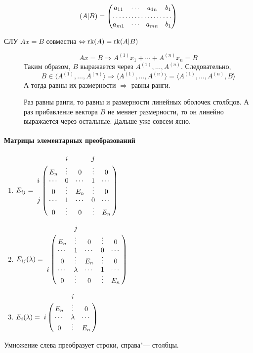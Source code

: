 \documentclass[12pt]{../../../notes}
\begin{document}
\begin{defn}\label{defn:extmtx}
  \[
    (A|B) = 
    \begin{pmatrix}
      a_{11} & \cdots & a_{1n} & b_1 \\
      \hdotsfor{4} \\
      a_{m1} & \cdots & a_{mn} & b_1 
    \end{pmatrix}
  \]
\end{defn}
\begin{thrm}\label{thrm:kronkap}
  СЛУ $Ax =B$ совместна $\Leftrightarrow \operatorname{rk} (A) = \operatorname{rk} (A|B)$
\end{thrm}
\begin{ittproof}
  \begin{description}
    \item[\circlearound{$\Rightarrow$}] 
      \[
        A x = B \Rightarrow A^{(1)} x_1 + \dotsb + A^{(n)} x_n = B
      \]
      Таким образом, $B$ выражается через $A^{(1)}, \dotsc , A^{(n)}$.
      Следовательно,
      \[
        B \in \langle A^{(1)}, \dotsc , A^{(n)}\rangle 
        \Rightarrow 
        \langle A^{(1)}, \dotsc , A^{(n)}\rangle  = \langle A^{(1)}, \dotsc , A^{(n)}, B\rangle 
      \]
      А тогда равны их размерности $\Rightarrow$ равны ранги.
    \item[\circlearound{$\Leftarrow$}] 
      Раз равны ранги, то равны и размерности линейных оболочек столбцов. А раз прибавление
      вектора $B$ не меняет размерности, то он линейно выражается через остальные. Дальше уже
      совсем ясно.
  \end{description}
\end{ittproof}

\paragraph{Матрицы элементарных преобразований}
\begin{enumerate}[I]
  \item $\displaystyle
      E_{ij} = \bordermatrix{
        ~ & ~      & i      & ~      & j      &        \cr
        ~ & E_n    & \vdots & 0      & \vdots & 0      \cr
        i & \cdots & 0      & \cdots & 1      & \cdots \cr
        ~ & 0      & \vdots & E_n    & \vdots & 0      \cr
        j & \cdots & 1      & \cdots & 0      & \cdots \cr
        ~ & 0      & \vdots & 0      & \vdots & E_n    \cr
      }
    $
  \item $\displaystyle
      E_{ij}(\lambda) = \bordermatrix{
        ~ & ~      & j      & ~      & ~      &        \cr
        ~ & E_n    & \vdots & 0      & \vdots & 0      \cr
        ~ & \cdots & 1      & \cdots & 0      & \cdots \cr
        ~ & 0      & \vdots & E_n    & \vdots & 0      \cr
        i & \cdots & \lambda& \cdots & 1      & \cdots \cr
        ~ & 0      & \vdots & 0      & \vdots & E_n    \cr
      }
    $
  \item $\displaystyle
      E_{i}(\lambda) = \bordermatrix{
        ~ & ~      & i       & ~      \cr
        ~ & E_n    & \vdots  & 0      \cr
        i & \cdots & \lambda & \cdots \cr
        ~ & 0      & \vdots  & E_n    \cr
      }
    $
\end{enumerate}
Умножение слева преобразует строки, справа"--- столбцы.
\end{document}
